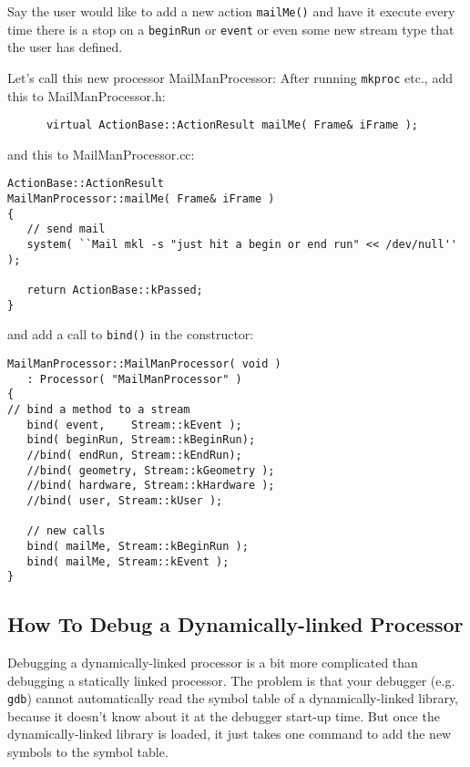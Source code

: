 \documentclass[12pt]{article}
\begin{document}
Say the user would like to add a new action \texttt{mailMe()} and have
it execute every time there is a stop on a \texttt{beginRun} or
\texttt{event} or even some new stream type that the user has
defined.

Let's call this new processor MailManProcessor:
After running \texttt{mkproc} etc., add this to MailManProcessor.h:
\begin{verbatim}
      virtual ActionBase::ActionResult mailMe( Frame& iFrame );
\end{verbatim}
%
and this to MailManProcessor.cc:
%
\begin{verbatim}
ActionBase::ActionResult
MailManProcessor::mailMe( Frame& iFrame ) 
{
   // send mail
   system( ``Mail mkl -s "just hit a begin or end run" << /dev/null'' );

   return ActionBase::kPassed;
}
\end{verbatim}
%
and add a call to \texttt{bind()} in the constructor:
%
\begin{verbatim}
MailManProcessor::MailManProcessor( void )
   : Processor( "MailManProcessor" )
{
// bind a method to a stream
   bind( event,    Stream::kEvent );
   bind( beginRun, Stream::kBeginRun);
   //bind( endRun, Stream::kEndRun);
   //bind( geometry, Stream::kGeometry );
   //bind( hardware, Stream::kHardware );
   //bind( user, Stream::kUser );

   // new calls
   bind( mailMe, Stream::kBeginRun );
   bind( mailMe, Stream::kEvent );
}
\end{verbatim}


\subsection{How To Debug a Dynamically-linked Processor
   }
\label{sec:DebugSharedProcessor}

Debugging a dynamically-linked processor is a bit more complicated than
debugging a statically linked processor. The problem is that your
debugger (e.g. \texttt{gdb}) cannot automatically read the symbol table
of a dynamically-linked library, because it doesn't know about it at the
debugger start-up time.  But once the dynamically-linked library is
loaded, it just takes one command to add the new symbols to the symbol
table.
\end{document}
